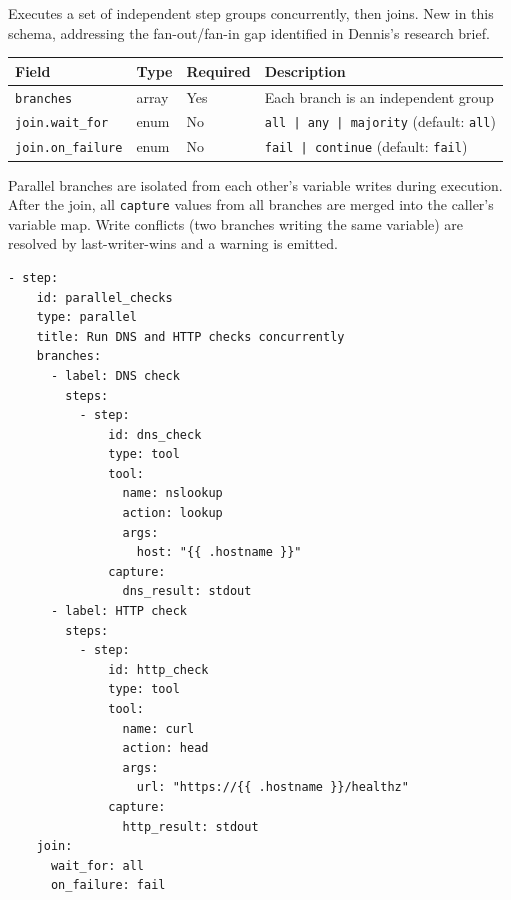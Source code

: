 Executes a set of independent step groups concurrently, then joins.  New in this schema,
addressing the fan-out/fan-in gap identified in Dennis's research brief.

\begin{center}
\begin{tabular}{lllp{5cm}}
\hline
\textbf{Field} & \textbf{Type} & \textbf{Required} & \textbf{Description} \\
\hline
\texttt{branches}          & array  & Yes & Each branch is an independent group \\
\texttt{join.wait\_for}    & enum   & No  & \texttt{all | any | majority} (default: \texttt{all}) \\
\texttt{join.on\_failure}  & enum   & No  & \texttt{fail | continue} (default: \texttt{fail}) \\
\hline
\end{tabular}
\end{center}

Parallel branches are isolated from each other's variable writes during
execution.  After the join, all \texttt{capture} values from all branches are
merged into the caller's variable map.  Write conflicts (two branches writing the
same variable) are resolved by last-writer-wins and a warning is emitted.

\begin{verbatim}
- step:
    id: parallel_checks
    type: parallel
    title: Run DNS and HTTP checks concurrently
    branches:
      - label: DNS check
        steps:
          - step:
              id: dns_check
              type: tool
              tool:
                name: nslookup
                action: lookup
                args:
                  host: "{{ .hostname }}"
              capture:
                dns_result: stdout
      - label: HTTP check
        steps:
          - step:
              id: http_check
              type: tool
              tool:
                name: curl
                action: head
                args:
                  url: "https://{{ .hostname }}/healthz"
              capture:
                http_result: stdout
    join:
      wait_for: all
      on_failure: fail
\end{verbatim}

